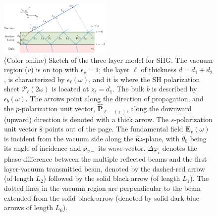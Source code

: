 \documentclass[aps,prb,10pt,showpacs,letterpaper,twocolumn]{revtex4-1}
\begin{document}
\begin{figure}[t]
\centering 
\includegraphics[width=0.48\textwidth]{figures/fig1}
\caption{(Color online) Sketch of the three layer model for SHG. The vacuum
region ($v$) is on top with $\epsilon_{v}=1$; the layer $\ell$ of thickness $d =
d_{1} + d_{2}$, is characterized by $\epsilon_{\ell}(\omega)$, and it is where
the SH polarization sheet $\boldsymbol{\mathcal{P}}_{\ell}(2\omega)$ is located
at $z_{\ell} = d_{1}$. The bulk $b$ is described by $\epsilon_{b}(\omega)$. The
arrows point along the direction of propagation, and the $p$-polarization unit
vector, $\hat{\mathbf{P}}_{\ell -(+)}$, along the downward (upward) direction is
denoted with a thick arrow. The $s$-polarization unit vector $\hat{\mathbf{s}}$
points out of the page. The fundamental field $\mathbf{E}_v(\omega)$ is incident
from the vacuum side along the $\hat{\boldsymbol{\kappa}}z$-plane, with
$\theta_{0}$ being its angle of incidence and $\boldsymbol{\nu}_{v-}$ its wave
vector. $\Delta\varphi_{i}$ denotes the phase difference between the multiple
reflected beams and the first layer-vacuum transmitted beam, denoted by the
dashed-red arrow (of length $L_{2}$) followed by the solid black arrow (of
length $L_{1}$). The dotted lines in the vacuum region are perpendicular to the
beam extended from the solid black arrow (denoted by solid dark blue arrows of
length $L_{6}$).}
\label{fig:MR3layer2w}
\end{figure}
\end{document}
